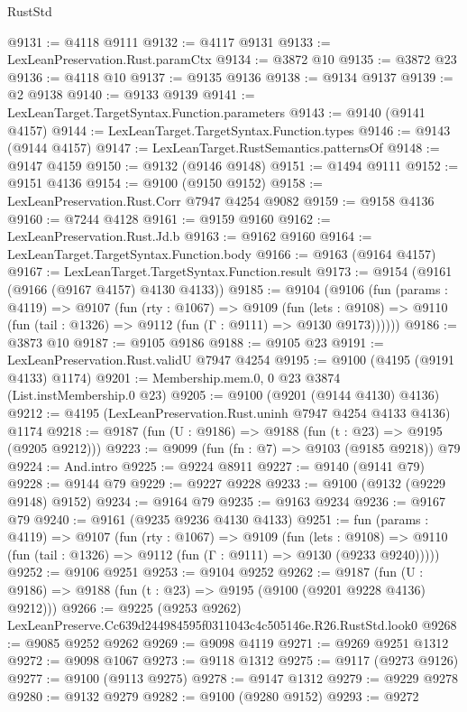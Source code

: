 \begin{lexlean}{RustStd}
\begin{coremodule}
@9131 := @4118 @9111
@9132 := @4117 @9131
@9133 := LexLeanPreservation.Rust.paramCtx
@9134 := @3872 @10
@9135 := @3872 @23
@9136 := @4118 @10
@9137 := @9135 @9136
@9138 := @9134 @9137
@9139 := @2 @9138
@9140 := @9133 @9139
@9141 := LexLeanTarget.TargetSyntax.Function.parameters
@9143 := @9140 (@9141 @4157)
@9144 := LexLeanTarget.TargetSyntax.Function.types
@9146 := @9143 (@9144 @4157)
@9147 := LexLeanTarget.RustSemantics.patternsOf
@9148 := @9147 @4159
@9150 := @9132 (@9146 @9148)
@9151 := @1494 @9111
@9152 := @9151 @4136
@9154 := @9100 (@9150 @9152)
@9158 := LexLeanPreservation.Rust.Corr @7947 @4254 @9082
@9159 := @9158 @4136
@9160 := @7244 @4128
@9161 := @9159 @9160
@9162 := LexLeanPreservation.Rust.Jd.b
@9163 := @9162 @9160
@9164 := LexLeanTarget.TargetSyntax.Function.body
@9166 := @9163 (@9164 @4157)
@9167 := LexLeanTarget.TargetSyntax.Function.result
@9173 := @9154 (@9161 (@9166 (@9167 @4157) @4130 @4133))
@9185 := @9104
    (@9106
      (fun (params : @4119) =>
      @9107
        (fun (rty : @1067) =>
        @9109
          (fun (lets : @9108) =>
          @9110 (fun (tail : @1326) => @9112 (fun (Γ : @9111) => @9130 @9173))))))
@9186 := @3873 @10
@9187 := @9105 @9186
@9188 := @9105 @23
@9191 := LexLeanPreservation.Rust.validU @7947 @4254
@9195 := @9100 (@4195 (@9191 @4133) @1174)
@9201 := Membership.mem.{0, 0} @23 @3874 (List.instMembership.{0} @23)
@9205 := @9100 (@9201 (@9144 @4130) @4136)
@9212 := @4195 (LexLeanPreservation.Rust.uninh @7947 @4254 @4133 @4136) @1174
@9218 := @9187 (fun (U : @9186) => @9188 (fun (t : @23) => @9195 (@9205 @9212)))
@9223 := @9099 (fun (fn : @7) => @9103 (@9185 @9218)) @79
@9224 := And.intro
@9225 := @9224 @8911
@9227 := @9140 (@9141 @79)
@9228 := @9144 @79
@9229 := @9227 @9228
@9233 := @9100 (@9132 (@9229 @9148) @9152)
@9234 := @9164 @79
@9235 := @9163 @9234
@9236 := @9167 @79
@9240 := @9161 (@9235 @9236 @4130 @4133)
@9251 := fun (params : @4119) =>
  @9107
    (fun (rty : @1067) =>
    @9109
      (fun (lets : @9108) =>
      @9110 (fun (tail : @1326) => @9112 (fun (Γ : @9111) => @9130 (@9233 @9240)))))
@9252 := @9106 @9251
@9253 := @9104 @9252
@9262 := @9187 (fun (U : @9186) => @9188 (fun (t : @23) => @9195 (@9100 (@9201 @9228 @4136) @9212)))
@9266 := @9225 (@9253 @9262) LexLeanPreserve.Cc639d244984595f0311043c4c505146e.R26.RustStd.look0
@9268 := @9085 @9252 @9262
@9269 := @9098 @4119
@9271 := @9269 @9251 @1312
@9272 := @9098 @1067
@9273 := @9118 @1312
@9275 := @9117 (@9273 @9126)
@9277 := @9100 (@9113 @9275)
@9278 := @9147 @1312
@9279 := @9229 @9278
@9280 := @9132 @9279
@9282 := @9100 (@9280 @9152)
@9293 := @9272

\end{coremodule}
\end{lexlean}
